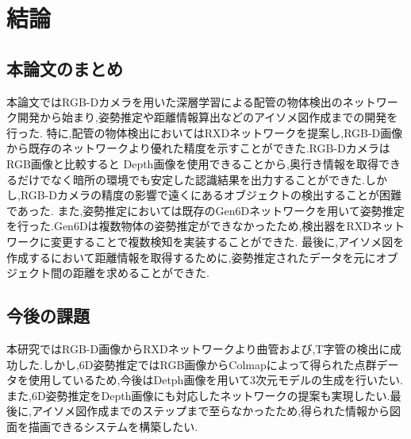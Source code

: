 ﻿\chapter{結論}

\section{本論文のまとめ}
本論文ではRGB-Dカメラを用いた深層学習による配管の物体検出のネットワーク開発から始まり,姿勢推定や距離情報算出などのアイソメ図作成までの開発を行った.
特に,配管の物体検出においてはRXDネットワークを提案し,RGB-D画像から既存のネットワークより優れた精度を示すことができた.RGB-DカメラはRGB画像と比較すると
Depth画像を使用できることから,奥行き情報を取得できるだけでなく暗所の環境でも安定した認識結果を出力することができた.しかし,RGB-Dカメラの精度の影響で遠くにあるオブジェクトの検出することが困難であった.
また,姿勢推定においては既存のGen6Dネットワークを用いて姿勢推定を行った.Gen6Dは複数物体の姿勢推定ができなかったため,検出器をRXDネットワークに変更することで複数検知を実装することができた.
最後に,アイソメ図を作成するにおいて距離情報を取得するために,姿勢推定されたデータを元にオブジェクト間の距離を求めることができた.

\section{今後の課題}
本研究ではRGB-D画像からRXDネットワークより曲管および,T字管の検出に成功した.しかし,6D姿勢推定ではRGB画像からColmapによって得られた点群データを使用しているため,今後はDetph画像を用いて3次元モデルの生成を行いたい.
また,6D姿勢推定をDepth画像にも対応したネットワークの提案も実現したい.最後に,アイソメ図作成までのステップまで至らなかったため,得られた情報から図面を描画できるシステムを構築したい.